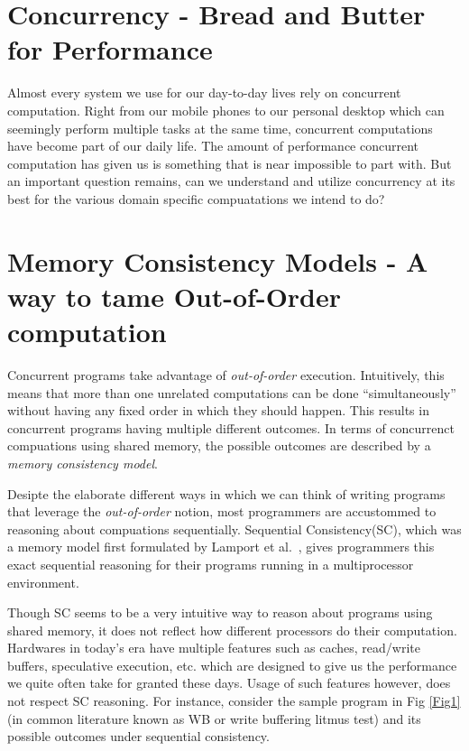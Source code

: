 \documentclass{article}
\begin{document}
    \section{Concurrency - Bread and Butter for Performance}

        Almost every system we use for our day-to-day lives rely on concurrent computation. 
        Right from our mobile phones to our personal desktop which can seemingly perform multiple tasks at the same time, concurrent computations have become part of our daily life.
        The amount of performance concurrent computation has given us is something that is near impossible to part with. 
        But an important question remains, can we understand and utilize concurrency at its best for the various domain specific compuatations we intend to do? 

    \section{Memory Consistency Models - A way to tame Out-of-Order computation}



        Concurrent programs take advantage of \textit{out-of-order} execution. 
        Intuitively, this means that more than one unrelated computations can be done ``simultaneously'' without having any fixed order in which they should happen.
        This results in concurrent programs having multiple different outcomes.
        In terms of concurrenct compuations using shared memory, the possible outcomes are described by
        a \textit{memory consistency model}. 
        
        Desipte the elaborate different ways in which we can think of writing programs that leverage the \textit{out-of-order} notion, most programmers are accustommed to reasoning about compuations sequentially. 
        Sequential Consistency(SC), which was a memory model first formulated by Lamport et al.~\cite{Lamport79}, gives programmers this exact sequential reasoning for their programs running in a multiprocessor environment.
        
        Though SC seems to be a very intuitive way to reason about programs using shared memory, it does not reflect how different processors do their computation.
        Hardwares in today's era have multiple features such as caches, read/write buffers, speculative execution, etc. which are designed to give us the performance we quite often take for granted these days.
        Usage of such features however, does not respect SC reasoning.
        For instance, consider the sample program in Fig \ref{Fig1} (in common literature known as WB or write buffering litmus test) and its possible outcomes under sequential consistency.
\end{document}
